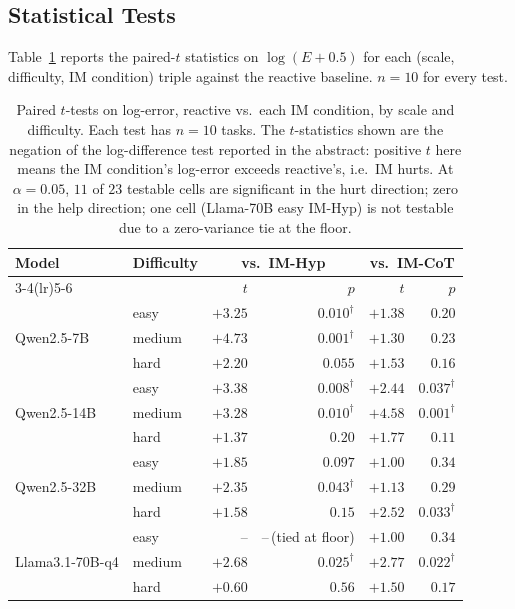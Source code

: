 \documentclass[11pt]{article}
\newcommand{\hurts}{\text{$\dagger$}}
\begin{document}
\subsection{Statistical Tests}

Table~\ref{tab:ttests} reports the paired-$t$ statistics on
$\log(E + 0.5)$ for each (scale, difficulty, IM condition) triple
against the reactive baseline.  $n = 10$ for every test.

\begin{table}[t]
\centering
\caption{Paired $t$-tests on log-error, reactive vs.\ each IM
condition, by scale and difficulty.  Each test has $n = 10$ tasks.
The $t$-statistics shown are the negation of the
log-difference test reported in the abstract: positive $t$ here
means the IM condition's log-error exceeds reactive's, i.e.\ IM
hurts.  At $\alpha = 0.05$, $11$ of $23$ testable cells are
significant in the hurt direction; zero in the help direction;
one cell (Llama-70B easy IM-Hyp) is not testable due to a
zero-variance tie at the floor.}
\label{tab:ttests}
\small
\begin{tabular}{l l rr rr}
\toprule
Model & Difficulty
  & \multicolumn{2}{c}{vs.\ IM-Hyp}
  & \multicolumn{2}{c}{vs.\ IM-CoT} \\
\cmidrule(lr){3-4}\cmidrule(lr){5-6}
 & & $t$ & $p$ & $t$ & $p$ \\
\midrule
\multirow{3}{*}{Qwen2.5-7B}
  & easy   & $+3.25$ & $\mathbf{0.010}^{\hurts}$ & $+1.38$ & $0.20$  \\
  & medium & $+4.73$ & $\mathbf{0.001}^{\hurts}$ & $+1.30$ & $0.23$  \\
  & hard   & $+2.20$ & $0.055$                   & $+1.53$ & $0.16$  \\
\multirow{3}{*}{Qwen2.5-14B}
  & easy   & $+3.38$ & $\mathbf{0.008}^{\hurts}$ & $+2.44$ & $\mathbf{0.037}^{\hurts}$ \\
  & medium & $+3.28$ & $\mathbf{0.010}^{\hurts}$ & $+4.58$ & $\mathbf{0.001}^{\hurts}$ \\
  & hard   & $+1.37$ & $0.20$                    & $+1.77$ & $0.11$  \\
\multirow{3}{*}{Qwen2.5-32B}
  & easy   & $+1.85$ & $0.097$                   & $+1.00$ & $0.34$  \\
  & medium & $+2.35$ & $\mathbf{0.043}^{\hurts}$ & $+1.13$ & $0.29$  \\
  & hard   & $+1.58$ & $0.15$                    & $+2.52$ & $\mathbf{0.033}^{\hurts}$ \\
\multirow{3}{*}{Llama3.1-70B-q4}
  & easy   & --      & --\,(tied at floor)        & $+1.00$ & $0.34$  \\
  & medium & $+2.68$ & $\mathbf{0.025}^{\hurts}$ & $+2.77$ & $\mathbf{0.022}^{\hurts}$ \\
  & hard   & $+0.60$ & $0.56$                    & $+1.50$ & $0.17$  \\
\bottomrule
\end{tabular}
\end{table}
\end{document}
